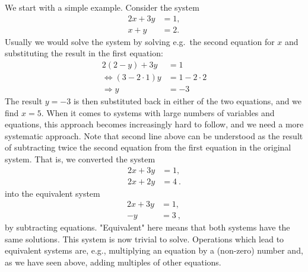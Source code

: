 \documentclass[
  a4paper,
  DIV=11,
  numbers=noendperiod,
  oneside]{scrreprt}
\theoremstyle{definition}
\theoremstyle{remark}
\begin{document}
We start with a simple example. Consider the system \[\begin{aligned}
2x + 3y  & = 1,  \\
x+y & = 2 .  
\end{aligned}\] Usually we would solve the system by solving e.g.~the
second equation for \(x\) and substituting the result in the first
equation: \begin{align*}
 2(2-y) + 3y & = 1   \\ 
 \Leftrightarrow   (3-2\cdot 1)y & = 1- 2\cdot 2 \\
 \Rightarrow y & =-3 
\end{align*} The result \(y=-3\) is then substituted back in either of
the two equations, and we find \(x=5\). When it comes to systems with
large numbers of variables and equations, this approach becomes
increasingly hard to follow, and we need a more systematic approach.
Note that second line above can be understood as the result of
subtracting twice the second equation from the first equation in the
original system. That is, we converted the system \begin{align*}
2x + 3y  &=  1 ,\\
2x+ 2y &= 4 \ .
\end{align*} into the equivalent system \begin{align*}
2x + 3y  &=  1 ,\\
      - y &= 3 \ , 
\end{align*} by subtracting equations. "Equivalent" here means that both
systems have the same solutions. This system is now trivial to solve.
Operations which lead to equivalent systems are, e.g., multiplying an
equation by a (non-zero) number and, as we have seen above, adding
multiples of other equations.
\end{document}
